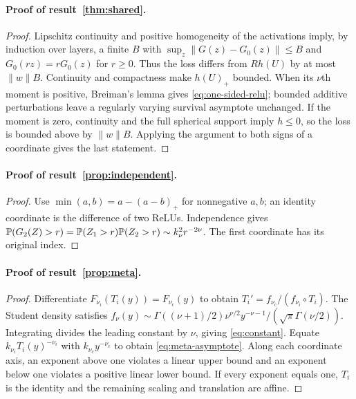 \documentclass[11pt]{article}
\theoremstyle{definition}\newtheorem{definition}[theorem]{Definition}
\theoremstyle{remark}\newtheorem{remark}[theorem]{Remark}
\begin{document}
\paragraph{Proof of result~\ref{thm:shared}.}
\begin{proof}
Lipschitz continuity and positive homogeneity of the activations imply, by induction over layers, a finite $B$ with $\sup_z\|G(z)-G_0(z)\|\le B$ and $G_0(rz)=rG_0(z)$ for $r\ge0$. Thus the loss differs from $Rh(U)$ by at most $\|w\|B$. Continuity and compactness make $h(U)_+$ bounded. When its $\nu$th moment is positive, Breiman's lemma gives \eqref{eq:one-sided-relu}; bounded additive perturbations leave a regularly varying survival asymptote unchanged. If the moment is zero, continuity and the full spherical support imply $h\le0$, so the loss is bounded above by $\|w\|B$. Applying the argument to both signs of a coordinate gives the last statement.
\end{proof}

\paragraph{Proof of result~\ref{prop:independent}.}
\begin{proof}
Use $\min(a,b)=a-(a-b)_+$ for nonnegative $a,b$; an identity coordinate is the difference of two ReLUs. Independence gives $\mathbb P(G_2(Z)>r)=\mathbb P(Z_1>r)\mathbb P(Z_2>r)\sim k_\nu^2r^{-2\nu}$. The first coordinate has its original index.
\end{proof}

\paragraph{Proof of result~\ref{prop:meta}.}
\begin{proof}
Differentiate $F_{\nu_i}(T_i(y))=F_{\nu_c}(y)$ to obtain $T_i'=f_{\nu_c}/(f_{\nu_i}\circ T_i)$. The Student density satisfies
$f_\nu(y)\sim\Gamma((\nu+1)/2)\nu^{\nu/2}y^{-\nu-1}/(\sqrt\pi\Gamma(\nu/2))$.
Integrating divides the leading constant by $\nu$, giving \eqref{eq:constant}. Equate $k_{\nu_i}T_i(y)^{-\nu_i}$ with $k_{\nu_c}y^{-\nu_c}$ to obtain \eqref{eq:meta-asymptote}. Along each coordinate axis, an exponent above one violates a linear upper bound and an exponent below one violates a positive linear lower bound. If every exponent equals one, $T_i$ is the identity and the remaining scaling and translation are affine.
\end{proof}
\end{document}
